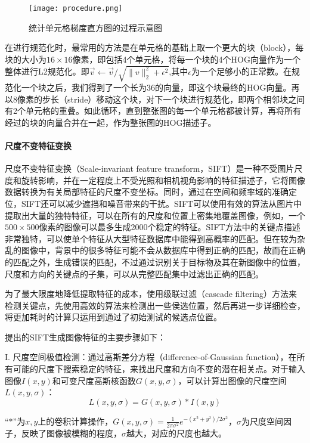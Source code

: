 \begin{figure}[htb]
  \centering
  \texttt{[image: procedure.png]}
  \caption{统计单元格梯度直方图的过程示意图}
  \label{fig:procedure}
\end{figure}

  在进行规范化时，最常用的方法是在单元格的基础上取一个更大的块（block），每块的大小为$16\times16$像素，即包括4个单元格，将每一个块的4个HOG向量作为一个整体进行L2规范化。即$\vec{v}\leftarrow\vec{v}/\sqrt{\lVert v \rVert^2_2 + \epsilon^2}$,其中$\epsilon$为一个足够小的正常数。在规范化一个块之后，我们得到了一个长为36的向量，即这个块最终的HOG向量。再以8像素的步长（stride）移动这个块，对下一个块进行规范化，即两个相邻块之间有2个单元格的重叠。如此循环，直到整张图的每一个单元格都被计算，再将所有经过的块的向量合并在一起，作为整张图的HOG描述子。

\paragraph{尺度不变特征变换}

  尺度不变特征变换（Scale-invariant feature transform，SIFT）是一种不受图片尺度和旋转影响，并在一定程度上不受光照和相机视角影响的特征描述子，它将图像数据转换为有关局部特征的尺度不变坐标。同时，通过在空间和频率域的准确定位，SIFT还可以减少遮挡和噪音带来的干扰。SIFT可以使用有效的算法从图片中提取出大量的独特特征，可以在所有的尺度和位置上密集地覆盖图像，例如，一个$500\times500$像素的图像可以最多生成2000个稳定的特征。SIFT方法中的关键点描述非常独特，可以使单个特征从大型特征数据库中能得到高概率的匹配。但在较为杂乱的图像中，背景中的很多特征可能不会从数据库中得到正确的匹配，故而在正确的匹配之外，生成错误的匹配，不过通过识别关于目标物及其在新图像中的位置，尺度和方向的关键点的子集，可以从完整匹配集中过滤出正确的匹配\cite{lowe2004distinctive}。

  为了最大限度地降低提取特征的成本，使用级联过滤（cascade filtering）方法来检测关键点，先使用高效的算法来检测出一些侯选位置，然后再进一步详细检查，将更加耗时的计算只运用到通过了初始测试的候选点位置。

  \citet{lowe2004distinctive}提出的SIFT生成图像特征的主要步骤如下：

  I. 尺度空间极值检测：通过高斯差分方程（difference-of-Gaussian function），在所有可能的尺度下搜索稳定的特征，来找出尺度和方向不变的潜在相关点。对于输入图像$I(x,y)$和可变尺度高斯核函数$G(x,y,\sigma)$，可以计算出图像的尺度空间$L(x,y,\sigma)$：
$$L(x,y,\sigma)=G(x,y,\sigma)\ast I(x,y)$$

  “$\ast$”为$x,y$上的卷积计算操作，$G(x,y,\sigma)=\frac{1}{2\pi\sigma^2}e^{-(x^2+y^2)/2\sigma^2}$，$\sigma$为尺度空间因子，反映了图像被模糊的程度，$\sigma$越大，对应的尺度也越大。

